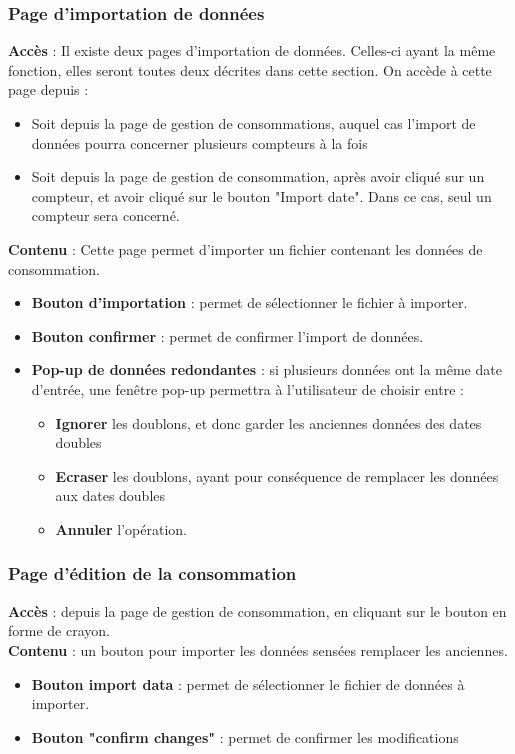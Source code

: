 \documentclass[../rapport.tex]{subfiles}
\begin{document}
\subsubsection{Page d'importation de données}
\noindent \textbf{Accès} : Il existe deux pages d'importation de données. Celles-ci ayant la même fonction, elles seront toutes deux décrites dans cette section. On accède à cette page depuis : \begin{itemize}
    \item Soit depuis la page de gestion de consommations, auquel cas l'import de données pourra concerner plusieurs compteurs à la fois 
    \item Soit depuis la page de gestion de consommation, après avoir cliqué sur un compteur, et avoir cliqué sur le bouton "Import date". Dans ce cas, seul un compteur sera concerné.
\end{itemize}
\textbf{Contenu }: Cette page permet d'importer un fichier contenant les données de consommation.
\begin{itemize}
    \item \textbf{Bouton d'importation} : permet de sélectionner le fichier à importer.
    \item \textbf{Bouton confirmer} : permet de confirmer l'import de données.
    \item \textbf{Pop-up de données redondantes} : si plusieurs données ont la même date d'entrée, une fenêtre pop-up permettra à l'utilisateur de choisir entre : \begin{itemize}
            \item \textbf{Ignorer} les doublons, et donc garder les anciennes données des dates doubles
            \item \textbf{Ecraser} les doublons, ayant pour conséquence de remplacer les données aux dates doubles 
            \item \textbf{Annuler} l'opération.
    \end{itemize}
\end{itemize}

\subsubsection{Page d'édition de la consommation}
\noindent \textbf{Accès} : depuis la page de gestion de consommation, en cliquant sur le bouton en forme de crayon. \\
\textbf{Contenu }: un bouton pour importer les données sensées remplacer les anciennes.
\begin{itemize}
    \item \textbf{Bouton import data} : permet de sélectionner le fichier de données à importer.
    \item \textbf{Bouton "confirm changes"} : permet de confirmer les modifications
\end{itemize}
\end{document}
